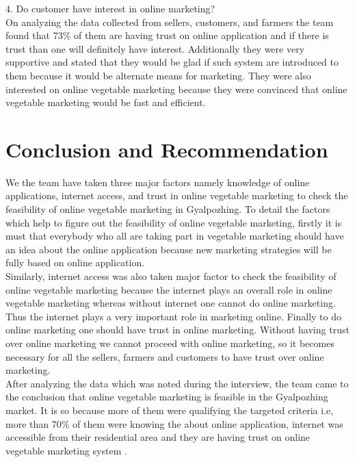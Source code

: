 \documentclass[12pt]{report}
\begin{document}
\begin{normalsize}
4. Do customer have interest in online marketing?\newline\\[0.1cm]
On analyzing the data collected from sellers, customers, and farmers the team found that 73\% of them are having trust on online application and if there is trust than one will definitely have interest. Additionally they were very supportive and stated that they would be glad if such system are introduced to them because it would be alternate means for marketing. They were also interested  on online vegetable marketing because they were convinced that online vegetable marketing would be fast and efficient.\newline\\[0.1cm]
\newpage
\chapter{Conclusion and Recommendation}	
\label{chapter_conclusion}
We the team have taken three major factors namely knowledge of online applications, internet access, and trust in online vegetable marketing to check the feasibility of online vegetable marketing in Gyalpozhing. To detail the factors which help to figure out the feasibility of online vegetable marketing, firstly it is must that everybody who all are taking part in vegetable marketing should have an idea about the online application because new marketing strategies will be fully based on online application.\newline\\[0.1cm]
Similarly, internet access was also taken major factor to check the feasibility of online vegetable marketing because the internet plays an overall role in online vegetable marketing whereas without internet one cannot do online marketing. Thus the internet plays a very important role in marketing online. Finally to do online marketing one should have trust in online marketing. Without having trust over online marketing we cannot proceed with online marketing, so it becomes necessary for all the sellers, farmers and customers to have trust over online marketing.\newline\\[0.1cm]
After analyzing the data which was noted during the interview, the team came to the conclusion that online vegetable marketing is feasible in the Gyalpozhing market. It is so because  more of them were qualifying the targeted criteria i.e, more than 70\% of them were knowing the about online application, internet was accessible  from their residential area and  they are having trust on online vegetable marketing system .\newline\\[0.1cm]

\end{normalsize}
\end{document}
